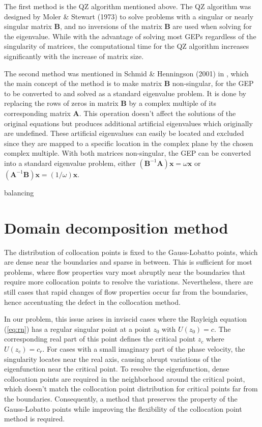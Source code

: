 The first method is the QZ algorithm mentioned above. The QZ algorithm was designed by Moler \& Stewart (1973) \cite{RN10} to solve problems with a singular or nearly singular matrix $\boldsymbol{B}$, and no inversions of the matrix $\boldsymbol{B}$ are used when solving for the eigenvalue. While with the advantage of solving most GEPs regardless of the singularity of matrices, the computational time for the QZ algorithm increases significantly with the increase of matrix size.

The second method was mentioned in Schmid \& Henningson (2001) in \cite{RN9}, which the main concept of the method is to make matrix $\boldsymbol{B}$ non-singular, for the GEP to be converted to and solved as a standard eigenvalue problem. It is done by replacing the rows of zeros in matrix $\boldsymbol{B}$ by a complex multiple of its corresponding matrix $\boldsymbol{A}$. This operation doesn't affect the solutions of the original equations but produces additional artificial eigenvalues which originally are undefined. These artificial eigenvalues can easily be located and excluded since they are mapped to a specific location in the complex plane by the chosen complex multiple. With both matrices non-singular, the GEP can be converted into a standard eigenvalue problem, either $(\boldsymbol{B}^{-1}\boldsymbol{A})\boldsymbol{x}=\omega\boldsymbol{x}$ or $(\boldsymbol{A}^{-1}\boldsymbol{B})\boldsymbol{x}=(1/\omega)\boldsymbol{x}$.

balancing

\section{Domain decomposition method} \label{ch:ddm}
The distribution of collocation points is fixed to the Gauss-Lobatto points, which are dense near the boundaries and sparse in between. This is sufficient for most problems, where flow properties vary most abruptly near the boundaries that require more collocation points to resolve the variations. Nevertheless, there are still cases that rapid changes of flow properties occur far from the boundaries, hence accentuating the defect in the collocation method.

In our problem, this issue arises in inviscid cases where the Rayleigh equation (\ref{eq:rn}) has a regular singular point at a point $z_0$ with $U(z_0)=c$. The corresponding real part of this point defines the critical point $z_c$ where $U(z_c)=c_r$. For cases with a small imaginary part of the phase velocity, the singularity locates near the real axis, causing abrupt variations of the eigenfunction near the critical point. To resolve the eigenfunction, dense collocation points are required in the neighborhood around the critical point, which doesn't match the collocation point distribution for critical points far from the boundaries. Consequently, a method that preserves the property of the Gauss-Lobatto points while improving the flexibility of the collocation point method is required.

